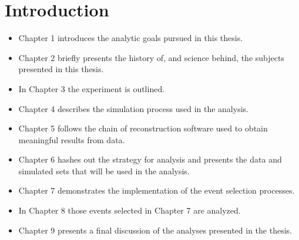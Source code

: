 \chapter{Introduction}
\label{intro_chapter}

\begin{itemize}
      \item Chapter 1 introduces the analytic goals pursued in this thesis.
      \item Chapter 2 briefly presents the history of, and science behind, the
            subjects presented in this thesis.
      \item In Chapter 3 the experiment is outlined.
      \item Chapter 4 describes the simulation process used in the analysis.
      \item Chapter 5 follows the chain of reconstruction software used to obtain
            meaningful results from data.
      \item Chapter 6 hashes out the strategy for analysis and presents the data and
            simulated sets that will be used in the analysis.
      \item Chapter 7 demonstrates the implementation of the event selection
            processes.
      \item In Chapter 8 those events selected in Chapter 7 are analyzed.
      \item Chapter 9 presents a final discussion of the analyses presented in the
            thesis.
\end{itemize}
